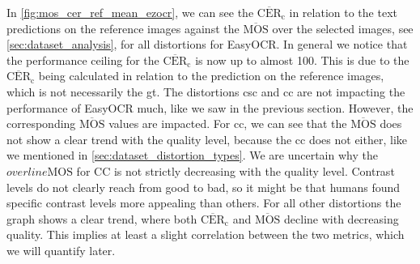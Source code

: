 In \autoref{fig:mos_cer_ref_mean_ezocr}, we can see the $\overline{\text{CER}}_{\text{c}}$ in relation to the text predictions on the reference images against the $\overline{\text{MOS}}$ over the selected images, see \autoref{sec:dataset_analysis}, for all distortions for EasyOCR.
In general we notice that the performance ceiling for the $\overline{\text{CER}}_{\text{c}}$ is now up to almost 100.
This is due to the $\overline{\text{CER}}_{\text{c}}$ being calculated in relation to the prediction on the reference images, which is not necessarily the \gls{gt}.
The distortions \gls{csc} and \gls{cc} are not impacting the performance of EasyOCR much, like we saw in the previous section.
However, the corresponding $\overline{\text{MOS}}$ values are impacted.
For \gls{cc}, we can see that the $\overline{\text{MOS}}$ does not show a clear trend with the quality level, because the \gls{cc} does not either, like we mentioned in \autoref{sec:dataset_distortion_types}.
We are uncertain why the $overline{\text{MOS}}$ for CC is not strictly decreasing with the quality level.
Contrast levels do not clearly reach from good to bad, so it might be that humans found specific contrast levels more appealing than others.
For all other distortions the graph shows a clear trend, where both $\overline{\text{CER}}_{\text{c}}$ and $\overline{\text{MOS}}$ decline with decreasing quality.
This implies at least a slight correlation between the two metrics, which we will quantify later.

